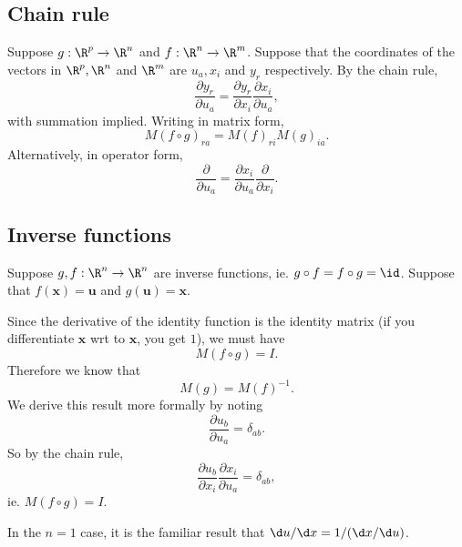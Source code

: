 \documentclass[a4paper]{article}
\begin{document}
\subsection{Chain rule}
\begin{thm}
  Suppose $g: \R^p\to\R^n$ and $f: \R^n \to \R^m$. Suppose that the coordinates of the vectors in $\R^p, \R^n$ and $\R^m$ are $u_a, x_i$ and $y_r$ respectively. By the chain rule,
  \[
    \frac{\partial y_r}{\partial u_a} = \frac{\partial y_r}{\partial x_i}\frac{\partial x_i}{\partial u_a},
  \]
  with summation implied. Writing in matrix form,
  \[
    M(f\circ g)_{ra} = M(f)_{ri}M(g)_{ia}.
  \]
  Alternatively, in operator form,
  \[
    \frac{\partial}{\partial u_a} = \frac{\partial x_i}{\partial u_a}\frac{\partial}{\partial x_i}.
  \]
\end{thm}

\subsection{Inverse functions}
Suppose $g, f: \R^n \to \R^n$ are inverse functions, ie. $g\circ f = f\circ g = \id$. Suppose that $f(\mathbf{x}) =\mathbf{u}$ and $g(\mathbf{u}) = \mathbf{x}$.

Since the derivative of the identity function is the identity matrix (if you differentiate $\mathbf{x}$ wrt to $\mathbf{x}$, you get $1$), we must have
\[
  M(f\circ g) = I.
\]
Therefore we know that 
\[
  M(g) = M(f)^{-1}.
\]
We derive this result more formally by noting
\[
  \frac{\partial u_b}{\partial u_a} = \delta_{ab}.
\]
So by the chain rule,
\[
  \frac{\partial u_b}{\partial x_i}\frac{\partial x_i}{\partial u_a} = \delta_{ab},
\]
ie. $M(f\circ g) = I$.

In the $n = 1$ case, it is the familiar result that $\d u/\d x = 1/(\d x/\d u)$.
\end{document}

